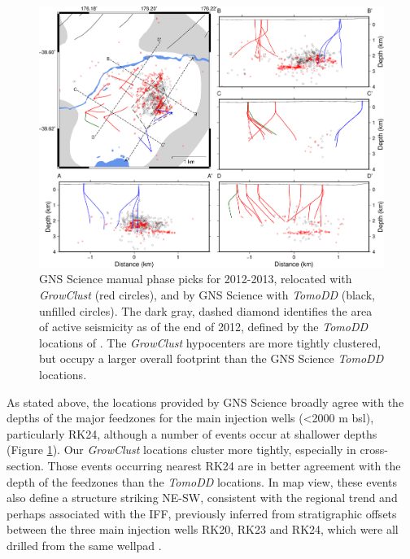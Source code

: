 \begin{figure}[h!]
\begin{center}
\includegraphics[width=0.98\columnwidth]{Chapter_4_Rot/figures/merc_Rot_GNS_comp/merc_Rot_GNS_GC-TomoDD}
\caption[\textit{GrowClust} vs \textit{TomoDD} relocation comparison]{{
GNS Science manual phase picks for 2012-2013, relocated with
\emph{GrowClust} (red circles), and by GNS Science with \textit{TomoDD} (black, unfilled circles). The dark gray, dashed diamond identifies the area of
active seismicity as of the end of 2012, defined by the \textit{TomoDD} locations of \citet{Sherburn_2015}. The \textit{GrowClust} hypocenters are more
tightly clustered, but occupy a larger overall footprint than the GNS
Science \textit{TomoDD} locations.
{\label{GNS_comp}}%
}}
\end{center}
\end{figure}

As stated above, the locations provided by GNS Science broadly agree with the depths of the major \glspl{feedzone} for the main injection wells (\textless2000 m bsl), particularly RK24, although a number of events occur at shallower depths (Figure \ref{GNS_comp}). Our \textit{GrowClust} locations cluster more tightly, especially in cross-section. Those events occurring nearest RK24 are in better agreement with the depth of the \glspl{feedzone} than the \textit{TomoDD} locations. In map view, these events also define a structure striking NE-SW, consistent with the regional trend and perhaps associated with the \acrlong{IFF}, previously inferred from stratigraphic offsets between the three main injection wells RK20, RK23 and RK24, which were all drilled from the same wellpad \citep{Sewell_2015}.

